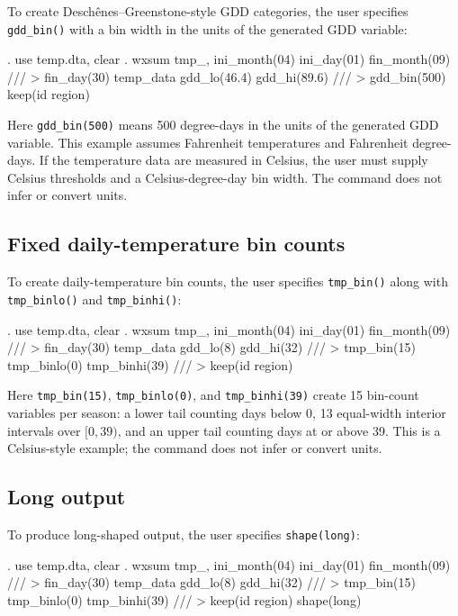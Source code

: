 To create Desch{\^e}nes--Greenstone-style GDD categories, the user specifies \texttt{gdd\_bin()} with a bin width in the units of the generated GDD variable:

\begin{stlog}
	. use temp.dta, clear
	. wxsum tmp_, ini_month(04) ini_day(01) fin_month(09) ///
	>     fin_day(30) temp_data gdd_lo(46.4) gdd_hi(89.6) ///
	>     gdd_bin(500) keep(id region)
\end{stlog}

\noindent Here \texttt{gdd\_bin(500)} means 500 degree-days in the units of the generated GDD variable. This example assumes Fahrenheit temperatures and Fahrenheit degree-days. If the temperature data are measured in Celsius, the user must supply Celsius thresholds and a Celsius-degree-day bin width. The command does not infer or convert units.

\subsection{Fixed daily-temperature bin counts}

To create daily-temperature bin counts, the user specifies \texttt{tmp\_bin()} along with \texttt{tmp\_binlo()} and \texttt{tmp\_binhi()}:

\begin{stlog}
	. use temp.dta, clear
	. wxsum tmp_, ini_month(04) ini_day(01) fin_month(09) ///
	>     fin_day(30) temp_data gdd_lo(8) gdd_hi(32) ///
	>     tmp_bin(15) tmp_binlo(0) tmp_binhi(39) ///
	>     keep(id region)
\end{stlog}

\noindent Here \texttt{tmp\_bin(15)}, \texttt{tmp\_binlo(0)}, and \texttt{tmp\_binhi(39)} create 15 bin-count variables per season: a lower tail counting days below 0, 13 equal-width interior intervals over $[0, 39)$, and an upper tail counting days at or above 39. This is a Celsius-style example; the command does not infer or convert units.

\subsection{Long output}

To produce long-shaped output, the user specifies \texttt{shape(long)}:

\begin{stlog}
	. use temp.dta, clear
	. wxsum tmp_, ini_month(04) ini_day(01) fin_month(09) ///
	>     fin_day(30) temp_data gdd_lo(8) gdd_hi(32) ///
	>     tmp_bin(15) tmp_binlo(0) tmp_binhi(39) ///
	>     keep(id region) shape(long)
\end{stlog}

